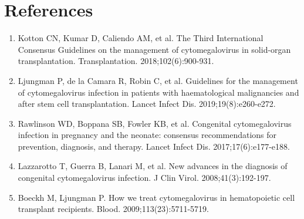 \section*{References}
\begin{enumerate}
  \item Kotton CN, Kumar D, Caliendo AM, et al. The Third International Consensus Guidelines on the management of cytomegalovirus in solid-organ transplantation. Transplantation. 2018;102(6):900-931.
  \item Ljungman P, de la Camara R, Robin C, et al. Guidelines for the management of cytomegalovirus infection in patients with haematological malignancies and after stem cell transplantation. Lancet Infect Dis. 2019;19(8):e260-e272.
  \item Rawlinson WD, Boppana SB, Fowler KB, et al. Congenital cytomegalovirus infection in pregnancy and the neonate: consensus recommendations for prevention, diagnosis, and therapy. Lancet Infect Dis. 2017;17(6):e177-e188.
  \item Lazzarotto T, Guerra B, Lanari M, et al. New advances in the diagnosis of congenital cytomegalovirus infection. J Clin Virol. 2008;41(3):192-197.
  \item Boeckh M, Ljungman P. How we treat cytomegalovirus in hematopoietic cell transplant recipients. Blood. 2009;113(23):5711-5719.
\end{enumerate}

\clearpage
